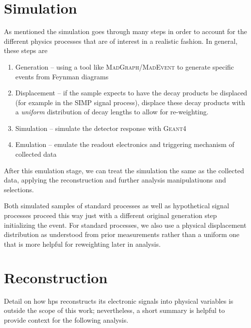 \section{Simulation} \label{sec:hps:sim}
As mentioned the simulation goes through many steps in order to account for the different physics
processes that are of interest in a realistic fashion. In general, these steps are
\begin{enumerate}
  \item Generation -- using a tool like \textsc{MadGraph/MadEvent}\cite{madgraph4-2004,madgraph5-2014}
        to generate specific events from Feynman diagrams
  \item Displacement -- if the sample expects to have the decay products be displaced (for example in the
        SIMP signal process), displace these decay products with a \emph{uniform} distribution of decay
        lengths to allow for re-weighting.
  \item Simulation -- simulate the detector response with \textsc{Geant4}\cite{geant4}
  \item Emulation -- emulate the readout electronics and triggering mechanism of collected data
\end{enumerate}
After this emulation stage, we can treat the simulation the same as the collected data,
applying the reconstruction and further analysis manipulatiuons and selections.

Both simulated samples of standard processes as well as hypothetical signal processes proceed this way
just with a different original generation step initializing the event. For standard processes, we also
use a physical displacement distribution as understood from prior measurements rather than a uniform
one that is more helpful for reweighting later in analysis.

\section{Reconstruction}
Detail on how \ac{hps} reconstructs its electronic signals into physical variables is
outside the scope of this work; nevertheless, a short summary is helpful to provide
context for the following analysis. 


